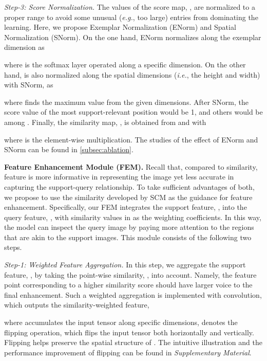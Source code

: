 \documentclass[10pt,twocolumn,letterpaper]{article}
\newcommand{\supp}{\textit{Supplementary Material}\xspace}
\begin{document}
\textit{Step-3: Score Normalization.}
The values of the score map, , are normalized to a proper range to avoid some unusual (\textit{e.g.}, too large) entries from dominating the learning.
Here, we propose Exemplar Normalization (ENorm) and Spatial Normalization (SNorm). 
On the one hand, ENorm normalizes  along the exemplar dimension as

where  is the softmax layer operated along a specific dimension. 
On the other hand,  is also normalized along the spatial dimensions (\textit{i.e.}, the height and width) with SNorm, as

where  finds the maximum value from the given dimensions. 
After SNorm, the score value of the most support-relevant position would be 1, and others would be among .
Finally, the similarity map, , is obtained from  and  with

where  is the element-wise multiplication.
The studies of the effect of ENorm and SNorm can be found in \cref{subsec:ablation}.





\vspace{2pt}\noindent\textbf{Feature Enhancement Module (FEM).}
Recall that, compared to similarity, feature is more informative in representing the image yet less accurate in capturing the support-query relationship.
To take sufficient advantages of both, we propose to use the similarity developed by SCM as the guidance for feature enhancement.
Specifically, our FEM integrates the support feature, , into the query feature, , with similarity values in  as the weighting coefficients.
In this way, the model can inspect the query image by paying more attention to the regions that are akin to the support images.
This module consists of the following two steps.


\textit{Step-1: Weighted Feature Aggregation.}
In this step, we aggregate the support feature, , by taking the point-wise similarity, , into account. 
Namely, the feature point corresponding to a higher similarity score should have larger voice to the final enhancement.
Such a weighted aggregation is implemented with convolution, which outputs the similarity-weighted feature,

where  accumulates the input tensor along specific dimensions, 
 denotes the flipping operation, which flips the input tensor both horizontally and vertically.
Flipping helps  preserve the spatial structure of .
The intuitive illustration and the performance improvement of flipping can be found in \supp.
\end{document}
